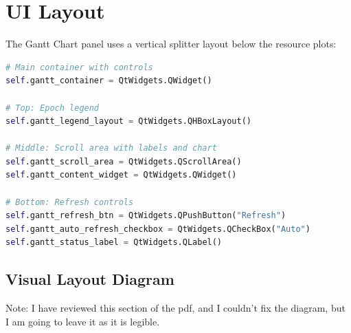 \documentclass[11pt,a4paper]{article}
\begin{document}
\section{UI Layout}

The Gantt Chart panel uses a vertical splitter layout below the resource plots:

\begin{lstlisting}[language=Python, caption={Gantt Chart Container Layout}]
# Main container with controls
self.gantt_container = QtWidgets.QWidget()

# Top: Epoch legend
self.gantt_legend_layout = QtWidgets.QHBoxLayout()

# Middle: Scroll area with labels and chart
self.gantt_scroll_area = QtWidgets.QScrollArea()
self.gantt_content_widget = QtWidgets.QWidget()

# Bottom: Refresh controls
self.gantt_refresh_btn = QtWidgets.QPushButton("Refresh")
self.gantt_auto_refresh_checkbox = QtWidgets.QCheckBox("Auto")
self.gantt_status_label = QtWidgets.QLabel()
\end{lstlisting}

\subsection{Visual Layout Diagram}

Note: I have reviewed this section of the pdf, and I couldn't fix the diagram, but I am going to leave it as it is legible.
\end{document}

